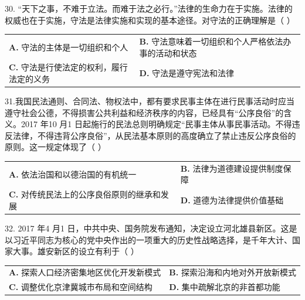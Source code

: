 \documentclass[UTF8,11pt]{ctexart}
\begin{document}
30. “天下之事，不难于立法。而难于法之必行。”法律的生命力在于实施。法律的权威也在于实施，守法是法律实施和实现的基本途径。对守法的正确理解是（      ）


\begin{center}\begin{tabular}{>{\raggedright\arraybackslash}p{\dimexpr(\linewidth-4\tabcolsep)/2\relax}>{\raggedright\arraybackslash}p{\dimexpr(\linewidth-4\tabcolsep)/2\relax}}
\textbf{A.} 守法的主体是一切组织和个人 & \textbf{B.} 守法意味着一切组织和个人严格依法办事的活动和状态\\[.35em]
\textbf{C.} 守法是行使法定的权利，履行法定的义务 & \textbf{D.} 守法是遵守宪法和法律\\[.35em]\end{tabular}\end{center}

31.我国民法通则、合同法、物权法中，都有要求民事主体在进行民事活动时应当遵守社会公德，不得损害公共利益和经济秩序的内容，已经具有“公序良俗”的含义。2017 年10 月1 日起施行的民法总则明确规定“民事主体从事民事活动。不得违反法律，不得违背公序良俗”，从民法基本原则的高度确立了禁止违反公序良俗的原则。这一规定体现了（      ）


\begin{center}\begin{tabular}{>{\raggedright\arraybackslash}p{\dimexpr(\linewidth-4\tabcolsep)/2\relax}>{\raggedright\arraybackslash}p{\dimexpr(\linewidth-4\tabcolsep)/2\relax}}
\textbf{A.} 依法治国和以德治国的有机统一 & \textbf{B.} 法律为道德建设提供制度保障\\[.35em]
\textbf{C.} 对传统民法上的公序良俗原则的继承和发展 & \textbf{D.} 道德为法律提供价值基础\\[.35em]\end{tabular}\end{center}

32. 2017 年4 月1 日，中共中央、国务院发布通知，决定设立河北雄县新区。这是以习近平同志为核心的党中央作出的一项重大的历史性战略选择，是千年大计、国家大事。雄安新区的设立有利于（      ）


\begin{center}\begin{tabular}{>{\raggedright\arraybackslash}p{\dimexpr(\linewidth-4\tabcolsep)/2\relax}>{\raggedright\arraybackslash}p{\dimexpr(\linewidth-4\tabcolsep)/2\relax}}
\textbf{A.} 探索人口经济密集地区优化开发新模式 & \textbf{B.} 探索沿海和内地对外开放新模式\\[.35em]
\textbf{C.} 调整优化京津冀城市布局和空间结构 & \textbf{D.} 集中疏解北京的非首都功能\\[.35em]\end{tabular}\end{center}
\end{document}

